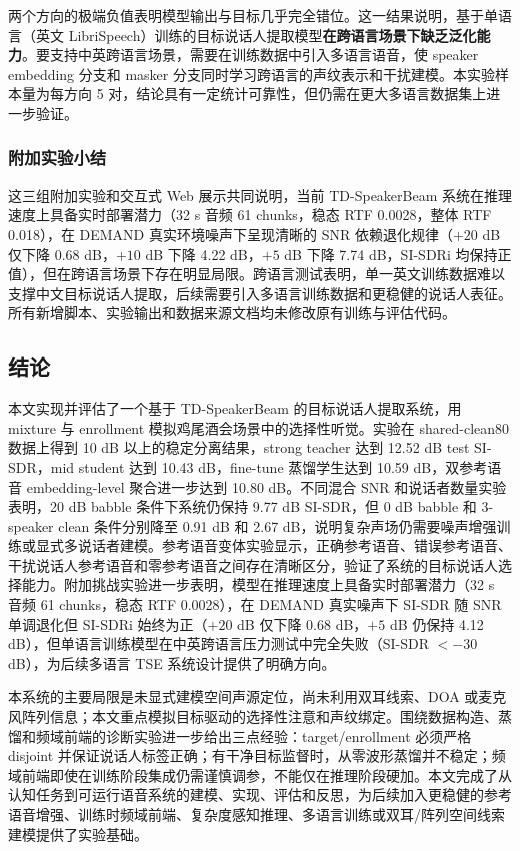 \documentclass[UTF8,zihao=5,a4paper]{ctexart}
\newcommand{\sisdr}{SI-SDR}
\begin{document}
两个方向的极端负值表明模型输出与目标几乎完全错位。这一结果说明，基于单语言（英文 LibriSpeech）训练的目标说话人提取模型\textbf{在跨语言场景下缺乏泛化能力}。要支持中英跨语言场景，需要在训练数据中引入多语言语音，使 speaker embedding 分支和 masker 分支同时学习跨语言的声纹表示和干扰建模。本实验样本量为每方向 5 对，结论具有一定统计可靠性，但仍需在更大多语言数据集上进一步验证。

\subsubsection{附加实验小结}

这三组附加实验和交互式 Web 展示共同说明，当前 TD-SpeakerBeam 系统在推理速度上具备实时部署潜力（32 s 音频 61 chunks，稳态 RTF 0.0028，整体 RTF 0.018），在 DEMAND 真实环境噪声下呈现清晰的 SNR 依赖退化规律（$+20$ dB 仅下降 0.68 dB，$+10$ dB 下降 4.22 dB，$+5$ dB 下降 7.74 dB，\sisdr{}i 均保持正值），但在跨语言场景下存在明显局限。跨语言测试表明，单一英文训练数据难以支撑中文目标说话人提取，后续需要引入多语言训练数据和更稳健的说话人表征。所有新增脚本、实验输出和数据来源文档均未修改原有训练与评估代码。

\subsection{结论}

本文实现并评估了一个基于 TD-SpeakerBeam 的目标说话人提取系统，用 mixture 与 enrollment 模拟鸡尾酒会场景中的选择性听觉。实验在 shared-clean80 数据上得到 10 dB 以上的稳定分离结果，strong teacher 达到 12.52 dB test \sisdr{}，mid student 达到 10.43 dB，fine-tune 蒸馏学生达到 10.59 dB，双参考语音 embedding-level 聚合进一步达到 10.80 dB。不同混合 SNR 和说话者数量实验表明，20 dB babble 条件下系统仍保持 9.77 dB \sisdr{}，但 0 dB babble 和 3-speaker clean 条件分别降至 0.91 dB 和 2.67 dB，说明复杂声场仍需要噪声增强训练或显式多说话者建模。参考语音变体实验显示，正确参考语音、错误参考语音、干扰说话人参考语音和零参考语音之间存在清晰区分，验证了系统的目标说话人选择能力。附加挑战实验进一步表明，模型在推理速度上具备实时部署潜力（32 s 音频 61 chunks，稳态 RTF 0.0028），在 DEMAND 真实噪声下 \sisdr{} 随 SNR 单调退化但 \sisdr{}i 始终为正（$+20$ dB 仅下降 0.68 dB，$+5$ dB 仍保持 4.12 dB），但单语言训练模型在中英跨语言压力测试中完全失败（\sisdr{} $< -30$ dB），为后续多语言 TSE 系统设计提供了明确方向。

本系统的主要局限是未显式建模空间声源定位，尚未利用双耳线索、DOA 或麦克风阵列信息；本文重点模拟目标驱动的选择性注意和声纹绑定。围绕数据构造、蒸馏和频域前端的诊断实验进一步给出三点经验：target/enrollment 必须严格 disjoint 并保证说话人标签正确；有干净目标监督时，从零波形蒸馏并不稳定；频域前端即使在训练阶段集成仍需谨慎调参，不能仅在推理阶段硬加。本文完成了从认知任务到可运行语音系统的建模、实现、评估和反思，为后续加入更稳健的参考语音增强、训练时频域前端、复杂度感知推理、多语言训练或双耳/阵列空间线索建模提供了实验基础。
\end{document}
